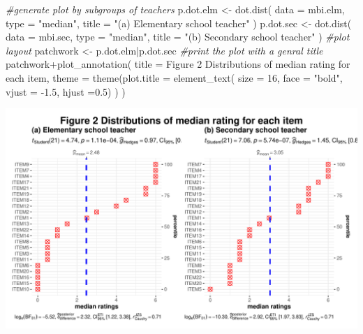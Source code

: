 \documentclass[
]{article}
\newenvironment{Shaded}{\begin{snugshade}}{\end{snugshade}}
\newcommand{\AttributeTok}[1]{\textcolor[rgb]{0.77,0.63,0.00}{#1}}
\newcommand{\CommentTok}[1]{\textcolor[rgb]{0.56,0.35,0.01}{\textit{#1}}}
\newcommand{\DecValTok}[1]{\textcolor[rgb]{0.00,0.00,0.81}{#1}}
\newcommand{\FloatTok}[1]{\textcolor[rgb]{0.00,0.00,0.81}{#1}}
\newcommand{\FunctionTok}[1]{\textcolor[rgb]{0.00,0.00,0.00}{#1}}
\newcommand{\NormalTok}[1]{#1}
\newcommand{\OtherTok}[1]{\textcolor[rgb]{0.56,0.35,0.01}{#1}}
\newcommand{\SpecialCharTok}[1]{\textcolor[rgb]{0.00,0.00,0.00}{#1}}
\newcommand{\StringTok}[1]{\textcolor[rgb]{0.31,0.60,0.02}{#1}}
\begin{document}
\begin{Shaded}
\begin{Highlighting}[]
\CommentTok{\#generate plot by subgroups of teachers}
\NormalTok{p.dot.elm }\OtherTok{\textless{}{-}} 
  \FunctionTok{dot.dist}\NormalTok{(}
    \AttributeTok{data =}\NormalTok{ mbi.elm, }
    \AttributeTok{type =} \StringTok{"median"}\NormalTok{, }
    \AttributeTok{title =} \StringTok{"(a) Elementary school teacher"}
\NormalTok{    )}
\NormalTok{p.dot.sec }\OtherTok{\textless{}{-}} 
  \FunctionTok{dot.dist}\NormalTok{(}
    \AttributeTok{data =}\NormalTok{ mbi.sec, }
    \AttributeTok{type =} \StringTok{"median"}\NormalTok{, }
    \AttributeTok{title =} \StringTok{"(b) Secondary school teacher"}
\NormalTok{    )}
\CommentTok{\#plot layout}
\NormalTok{patchwork }\OtherTok{\textless{}{-}}\NormalTok{ p.dot.elm}\SpecialCharTok{|}\NormalTok{p.dot.sec}
\CommentTok{\#print the plot with a genral title}
\NormalTok{patchwork}\SpecialCharTok{+}\FunctionTok{plot\_annotation}\NormalTok{(}
    \AttributeTok{title =} 
      \StringTok{\textquotesingle{}Figure 2 Distributions of median rating for each item\textquotesingle{}}\NormalTok{,}
    \AttributeTok{theme =} 
      \FunctionTok{theme}\NormalTok{(}\AttributeTok{plot.title =} 
              \FunctionTok{element\_text}\NormalTok{(}
                \AttributeTok{size =} \DecValTok{16}\NormalTok{,}
                \AttributeTok{face =} \StringTok{"bold"}\NormalTok{,}
                \AttributeTok{vjust =} \SpecialCharTok{{-}}\FloatTok{1.5}\NormalTok{,}
                \AttributeTok{hjust =}\FloatTok{0.5}\NormalTok{)}
\NormalTok{            )}
\NormalTok{    )}
\end{Highlighting}
\end{Shaded}

\begin{center}\includegraphics{Assignment5_RongGuang_files/figure-latex/unnamed-chunk-15-1} \end{center}
\end{document}
